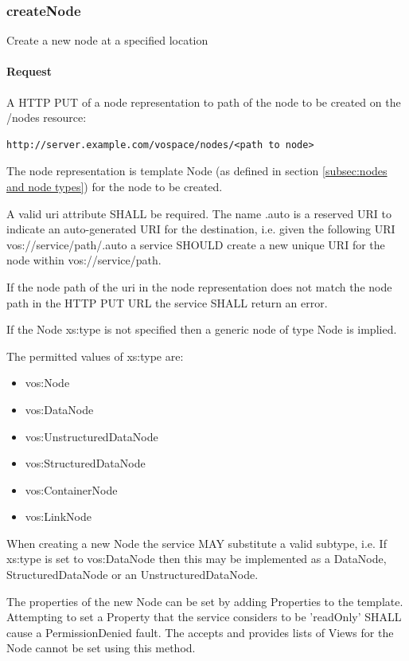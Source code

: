\documentclass[11pt,a4paper]{ivoa}
\begin{document}
\subsubsection{createNode}
\label{subsubsec:createnode}
Create a new node at a specified location

\paragraph{Request}
A HTTP PUT of a node representation to path of the node to be created on the /nodes resource:
\begin{verbatim}
http://server.example.com/vospace/nodes/<path to node>
\end{verbatim}
The node representation is template Node (as defined in section \ref{subsec:nodes and node types}) for the node to be created.

A valid uri attribute SHALL be required. The name .auto is a reserved URI to indicate an auto-generated URI for the destination, i.e. given the following URI vos://service/path/.auto a service SHOULD create a new unique URI for the node within vos://service/path.

If the node path of the uri in the node representation does not match the node path in the HTTP PUT URL the service SHALL return an error.

If the Node xs:type is not specified then a generic node of type Node is implied.

The permitted values of xs:type are:

\begin{itemize}
    \item vos:Node
    \item vos:DataNode
    \item vos:UnstructuredDataNode
    \item vos:StructuredDataNode
    \item vos:ContainerNode
    \item vos:LinkNode
\end{itemize}

When creating a new Node the service MAY substitute a valid subtype, i.e. If xs:type is set to vos:DataNode then this may be implemented as a DataNode, StructuredDataNode or an UnstructuredDataNode.

The properties of the new Node can be set by adding Properties to the template. Attempting to set a Property that the service considers to be 'readOnly' SHALL cause a PermissionDenied fault. The accepts and provides lists of Views for the Node cannot be set using this method.
\end{document}
